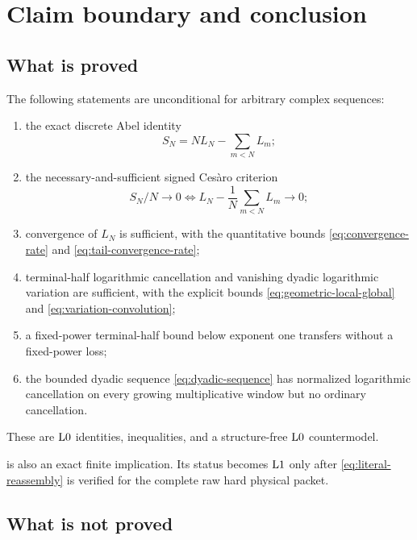 \section{Claim boundary and conclusion}
\label{sec:claim-boundary}

\subsection{What is proved}

The following statements are unconditional for arbitrary complex
sequences:
\begin{enumerate}[label=\textup{(\arabic*)},leftmargin=2.5em]
 \item the exact discrete Abel identity
 \[
  S_N=NL_N-\sum_{m<N}L_m;
 \]
 \item the necessary-and-sufficient signed Ces\`aro criterion
 \[
  S_N/N\to0\iff
  L_N-\frac1N\sum_{m<N}L_m\to0;
 \]
 \item convergence of \(L_N\) is sufficient, with the quantitative
 bounds \eqref{eq:convergence-rate} and
 \eqref{eq:tail-convergence-rate};
 \item terminal-half logarithmic cancellation and vanishing dyadic
 logarithmic variation are sufficient, with the explicit bounds
 \eqref{eq:geometric-local-global} and
 \eqref{eq:variation-convolution};
 \item a fixed-power terminal-half bound below exponent one
 transfers without a fixed-power loss;
 \item the bounded dyadic sequence
 \eqref{eq:dyadic-sequence} has normalized logarithmic cancellation
 on every growing multiplicative window but no ordinary
 cancellation.
\end{enumerate}
These are \(\mathrm{L0}\) identities, inequalities, and a
structure-free \(\mathrm{L0}\) countermodel.

 is also an exact finite implication.
Its status becomes \(\mathrm{L1}\) only after
\eqref{eq:literal-reassembly} is verified for the complete raw hard
physical packet.

\subsection{What is not proved}

